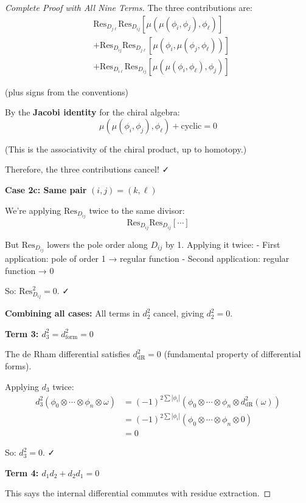 \begin{proof}[Complete Proof with All Nine Terms]
The three contributions are:
\begin{align*}
&\text{Res}_{D_{j\ell}} \text{Res}_{D_{ij}}[\mu(\mu(\phi_i, \phi_j), \phi_\ell)] \\
&+ \text{Res}_{D_{ij}} \text{Res}_{D_{j\ell}}[\mu(\phi_i, \mu(\phi_j, \phi_\ell))] \\
&+ \text{Res}_{D_{i\ell}} \text{Res}_{D_{ij}}[\mu(\mu(\phi_i, \phi_\ell), \phi_j)]
\end{align*}

(plus signs from the conventions)

By the \textbf{Jacobi identity} for the chiral algebra:
$$\mu(\mu(\phi_i, \phi_j), \phi_\ell) + \text{cyclic} = 0$$

(This is the associativity of the chiral product, up to homotopy.)

Therefore, the three contributions cancel! ✓

\textbf{Case 2c: Same pair} $(i,j) = (k,\ell)$

We're applying $\text{Res}_{D_{ij}}$ twice to the same divisor:
$$\text{Res}_{D_{ij}} \text{Res}_{D_{ij}}[\cdots]$$

But $\text{Res}_{D_{ij}}$ lowers the pole order along $D_{ij}$ by 1. Applying it twice:
- First application: pole of order 1 → regular function
- Second application: regular function → 0

So: $\text{Res}_{D_{ij}}^2 = 0$. ✓

\textbf{Combining all cases:} All terms in $d_2^2$ cancel, giving $d_2^2 = 0$.

\medskip
\noindent\textbf{Term 3: $d_3^2 = d_{\text{form}}^2 = 0$}

The de Rham differential satisfies $d_{\text{dR}}^2 = 0$ (fundamental property of differential forms).

Applying $d_3$ twice:
\begin{align*}
d_3^2(\phi_0 \otimes \cdots \otimes \phi_n \otimes \omega) &= (-1)^{2\sum |\phi_i|} (\phi_0 \otimes \cdots \otimes \phi_n \otimes d_{\text{dR}}^2(\omega)) \\
&= (-1)^{2\sum |\phi_i|} (\phi_0 \otimes \cdots \otimes \phi_n \otimes 0) \\
&= 0
\end{align*}

So: $d_3^2 = 0$. ✓

\medskip
\noindent\textbf{Term 4: $d_1 d_2 + d_2 d_1 = 0$}

This says the internal differential commutes with residue extraction.


\end{proof}
